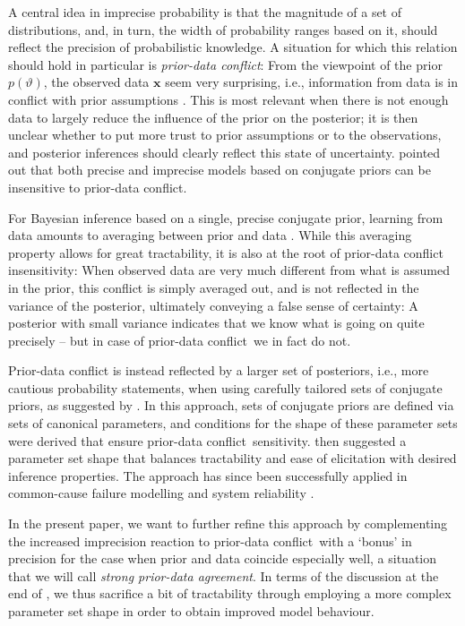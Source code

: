 \documentclass[runningheads,a4paper]{llncs}
\def\pdc{prior-data conflict}
\renewcommand{\vec}[1]{{\bm #1}}
\begin{document}
A central idea in imprecise probability is that the magnitude of a set of distributions,
and, in turn, the width of probability ranges based on it,
should reflect the precision of probabilistic knowledge.
A situation for which this relation should hold in particular is \emph{\pdc}:
From the viewpoint of the prior $p(\vartheta)$, the observed data $\vec{x}$ seem very surprising,
i.e., information from data is in conflict with prior assumptions \cite{2006:evans}. %
This is most relevant when there is not enough data to largely reduce the influence of the prior on the posterior;
it is then unclear whether to put more trust to prior assumptions or to the observations,
and posterior inferences should clearly reflect this state of uncertainty.
\cite{Walter2009a} pointed out that
both precise and imprecise models based on conjugate priors can be insensitive to prior-data conflict.

For Bayesian inference based on a single, precise conjugate prior,
learning from data amounts to averaging between prior and data
\cite[\S~1.2.3.1]{2013:diss-gw}.
While this averaging property allows for great tractability,
it is also at the root of prior-data conflict insensitivity: 
When observed data are very much different from what is assumed in the prior,
this conflict is simply averaged out,
and is not reflected in the variance of the posterior,
ultimately conveying a false sense of certainty:
A posterior with small variance indicates that we know what is going on quite precisely -- but in case of \pdc\ we in fact do not.

Prior-data conflict is instead reflected by a larger set of posteriors,
i.e., more cautious probability statements,
when using carefully tailored sets of conjugate priors,
as suggested by \cite{Walter2009a}.
In this approach, sets of conjugate priors are defined via sets of canonical parameters,
and conditions for the shape of these parameter sets were derived that ensure \pdc\ sensitivity.
\cite{Walter2009a} then suggested a parameter set shape
that balances tractability and ease of elicitation
with desired inference properties.
The approach has since been successfully applied in common-cause failure modelling \cite{Troffaes2014a}
and system reliability \cite{2015:walter}.

In the present paper, we want to further refine this approach
by complementing the increased imprecision reaction to \pdc\
with a `bonus' in precision for the case when prior and data coincide especially well,
a situation that we will call \emph{strong prior-data agreement}.
In terms of the discussion at the end of \cite[\S~3.1.4]{2013:diss-gw},
we thus sacrifice a bit of tractability through employing a more complex parameter set shape
in order to obtain improved model behaviour.%
\end{document}
